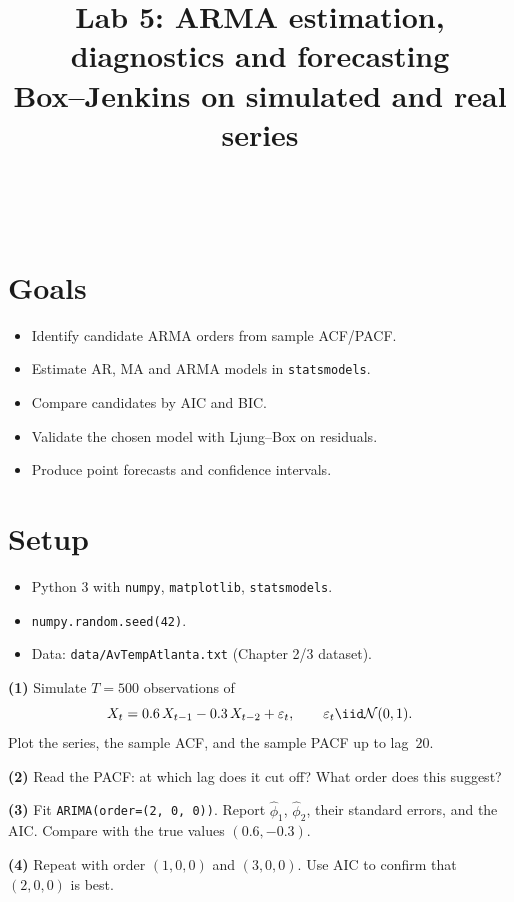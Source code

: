 \documentclass[a4paper,11pt]{article}
\title{Lab 5: ARMA estimation, diagnostics and forecasting\\
\large Box--Jenkins on simulated and real series}
\author{\auteurNom\\\auteurEmail\\\auteurInstitution}
\date{\anneeUniversitaire}
\begin{document}
\maketitle

\section*{Goals}
\begin{itemize}
  \item Identify candidate ARMA orders from sample ACF/PACF.
  \item Estimate AR, MA and ARMA models in \texttt{statsmodels}.
  \item Compare candidates by AIC and BIC.
  \item Validate the chosen model with Ljung--Box on residuals.
  \item Produce point forecasts and confidence intervals.
\end{itemize}

\section*{Setup}
\begin{itemize}
  \item Python 3 with \texttt{numpy}, \texttt{matplotlib},
        \texttt{statsmodels}.
  \item \texttt{numpy.random.seed(42)}.
  \item Data: \texttt{data/AvTempAtlanta.txt} (Chapter 2/3 dataset).
\end{itemize}

\begin{exercise}
\textbf{(1)} Simulate $T = 500$ observations of
\[
  X_t = 0.6\, X_{t-1} - 0.3\, X_{t-2} + \varepsilon_t,
  \qquad \varepsilon_t \iid \mathcal N(0, 1).
\]
Plot the series, the sample ACF, and the sample PACF up to lag~$20$.

\textbf{(2)} Read the PACF: at which lag does it cut off? What
order does this suggest?

\textbf{(3)} Fit \texttt{ARIMA(order=(2, 0, 0))}. Report
$\widehat\phi_1$, $\widehat\phi_2$, their standard errors, and the
AIC. Compare with the true values $(0.6, -0.3)$.

\textbf{(4)} Repeat with order $(1, 0, 0)$ and $(3, 0, 0)$. Use AIC
to confirm that $(2, 0, 0)$ is best.
\end{exercise}
\end{document}
